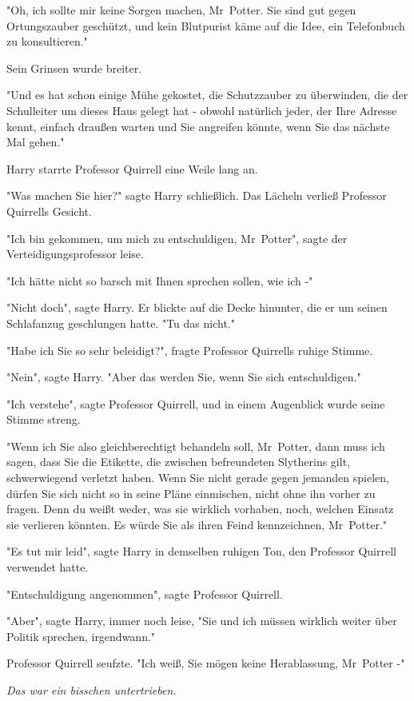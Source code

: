 {"Oh, ich sollte mir keine Sorgen machen, Mr~Potter. Sie sind gut gegen Ortungszauber geschützt, und kein Blutpurist käme auf die Idee, ein Telefonbuch zu konsultieren."

Sein Grinsen wurde breiter.

"Und es hat schon einige Mühe gekostet, die Schutzzauber zu überwinden, die der Schulleiter um dieses Haus gelegt hat - obwohl natürlich jeder, der Ihre Adresse kennt, einfach draußen warten und Sie angreifen könnte, wenn Sie das nächste Mal gehen."

Harry starrte Professor Quirrell eine Weile lang an.

"Was machen Sie hier?" sagte Harry schließlich. Das Lächeln verließ Professor Quirrells Gesicht.

"Ich bin gekommen, um mich zu entschuldigen, Mr~Potter", sagte der Verteidigungsprofessor leise.

"Ich hätte nicht so barsch mit Ihnen sprechen sollen, wie ich -"

"Nicht doch", sagte Harry. Er blickte auf die Decke hinunter, die er um seinen Schlafanzug geschlungen hatte. "Tu das nicht."

"Habe ich Sie so sehr beleidigt?", fragte Professor Quirrells ruhige Stimme.

"Nein", sagte Harry. "Aber das werden Sie, wenn Sie sich entschuldigen."

"Ich verstehe", sagte Professor Quirrell, und in einem Augenblick wurde seine Stimme streng.

"Wenn ich Sie also gleichberechtigt behandeln soll, Mr~Potter, dann muss ich sagen, dass Sie die Etikette, die zwischen befreundeten Slytherins gilt, schwerwiegend verletzt haben. Wenn Sie nicht gerade gegen jemanden spielen, dürfen Sie sich nicht so in seine Pläne einmischen, nicht ohne ihn vorher zu fragen. Denn du weißt weder, was sie wirklich vorhaben, noch, welchen Einsatz sie verlieren könnten. Es würde Sie als ihren Feind kennzeichnen, Mr~Potter."

"Es tut mir leid", sagte Harry in demselben ruhigen Ton, den Professor Quirrell verwendet hatte.

"Entschuldigung angenommen", sagte Professor Quirrell.

"Aber", sagte Harry, immer noch leise, "Sie und ich müssen wirklich weiter über Politik sprechen, irgendwann."

Professor Quirrell seufzte. "Ich weiß, Sie mögen keine Herablassung, Mr~Potter -"

\emph{Das war ein bisschen untertrieben.}

}
